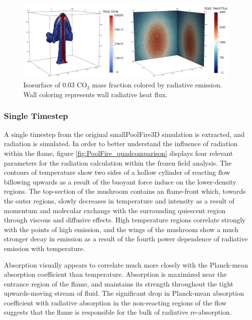 \begin{figure}
\includegraphics[width=\linewidth]{figures/ch4/radiation_contours.png}
\caption{Isosurface of 0.03 CO$_2$ mass fraction colored by radiative emission. Wall coloring represents wall radiative heat flux.}
\label{fig:PoolFire_radiationcontours}
\end{figure}

\subsubsection{Single Timestep}
A single timestep from the original smallPoolFire3D simulation is extracted, and radiation is simulated.
In order to better understand the influence of radiation within the flame, figure \ref{fig:PoolFire_quadcomparison} displays four relevant parameters for the radiation calculation within the frozen field analysis. 
The contours of temperature show two sides of a hollow cylinder of reacting flow billowing upwards as a result of the buoyant force induce on the lower-density regions.
The top-section of the mushroom contains an  flame-front which, towards the outer regions, slowly decreases in temperature and intensity as a result of momentum and molecular exchange with the surrounding quiescent region through viscous and diffusive effects.
High temperature regions correlate strongly with the points of high emission, and the wings of the mushroom show a much stronger decay in emission as a result of the fourth power dependence of radiative emission with temperature.

Absorption visually appears to correlate much more closely with the Planck-mean absorption coefficient than temperature. Absorption is maximized near the entrance region of the flame, and maintains its strength throughout the tight upwards-moving stream of fluid.
The significant drop in Planck-mean absorption coefficient with radiative absorption in the non-reacting regions of the flow suggests that the flame is responsible for the bulk of radiative re-absorption. 

